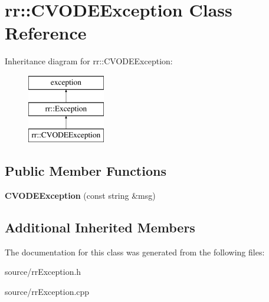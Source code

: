 \hypertarget{classrr_1_1_c_v_o_d_e_exception}{\section{rr\-:\-:C\-V\-O\-D\-E\-Exception Class Reference}
\label{classrr_1_1_c_v_o_d_e_exception}
}
Inheritance diagram for rr\-:\-:C\-V\-O\-D\-E\-Exception\-:\begin{figure}[H]
\begin{center}
\leavevmode
\includegraphics[height=3.000000cm]{classrr_1_1_c_v_o_d_e_exception}
\end{center}
\end{figure}
\subsection*{Public Member Functions}
\begin{DoxyCompactItemize}
\item 
\hypertarget{classrr_1_1_c_v_o_d_e_exception_a04b1bf996425851c6aa1b1ba70cb5ecb}{{\bfseries C\-V\-O\-D\-E\-Exception} (const string \&msg)}\label{classrr_1_1_c_v_o_d_e_exception_a04b1bf996425851c6aa1b1ba70cb5ecb}

\end{DoxyCompactItemize}
\subsection*{Additional Inherited Members}


The documentation for this class was generated from the following files\-:\begin{DoxyCompactItemize}
\item 
source/rr\-Exception.\-h\item 
source/rr\-Exception.\-cpp\end{DoxyCompactItemize}
